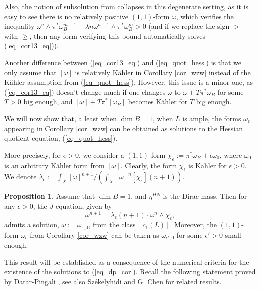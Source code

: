 \documentclass[12pt]{article}
\numberwithin{equation}{section}
\theoremstyle{theorem}
\theoremstyle{definition}
\newtheorem{prop}[thm]{Proposition}
\theoremstyle{remark}
\begin{document}
	Also, the notion of subsolution from \cite[(12)]{SzekQuotHess} collapses in this degenerate setting, as it is easy to see there is no relatively positive $(1, 1)$-form $\omega$, which verifies the inequality $\omega^n \wedge \pi^* \omega_B^{m - 1} - \lambda n \omega^{n - 1} \wedge \pi^* \omega_B^m > 0$ (and if we replace the sign $>$ with $\geq$, then any form verifying this bound automatically solves (\ref{eq_cor13_eq})).
	\par 
	Another difference between (\ref{eq_cor13_eq}) and (\ref{eq_quot_hess}) is that we only assume that $[\omega]$ is relatively Kähler in Corollary \ref{cor_wzw} instead of the Kähler assumption from (\ref{eq_quot_hess}). 
	However, this issue is a minor one, as (\ref{eq_cor13_eq}) doesn't change much if one changes $\omega$ to $\omega + T \pi^* \omega_B$ for some $T > 0$ big enough, and $[\omega] + T \pi^* [\omega_B]$ becomes Kähler for $T$ big enough.
	\par 
	We will now show that, a least when $\dim B = 1$, when $L$ is ample, the forms $\omega_{\epsilon}$ appearing in Corollary \ref{cor_wzw} can be obtained as solutions to the Hessian quotient equation, (\ref{eq_quot_hess}).
	\par 
	More precisely, for $\epsilon > 0$, we consider a $(1, 1)$-form $\chi_{\epsilon} := \pi^* \omega_B + \epsilon \omega_0$, where $\omega_0$ is an arbitrary Kähler form from $[\omega]$.
	Clearly, the form $\chi_{\epsilon}$ is Kähler for $\epsilon > 0$.
	We denote $\lambda_{\epsilon} := \int_X [\omega]^{n + 1} / ( \int_X [\omega]^n  [\chi_{\epsilon}] (n + 1) )$.
	\begin{prop}\label{prop_dp_cor}
		Assume that $\dim B = 1$, and $\eta^{HN}$ is the Dirac mass. Then for any $\epsilon > 0$, the $J$-equation, given by
		\begin{equation}\label{eq_dp_cor}
			\omega^{n + 1} = \lambda_{\epsilon} (n + 1) \cdot \omega^n \wedge \chi_{\epsilon},
		\end{equation}
		admits a solution, $\omega := \omega_{\epsilon, 0}$, from the class $[c_1(L)]$.
		Moreover, the $(1, 1)$-form $\omega_{\epsilon}$ from Corollary \ref{cor_wzw} can be taken as $\omega_{\epsilon', 0}$ for some $\epsilon' > 0$ small enough.
	\end{prop}
	This result will be established as a consequence of the numerical criteria for the existence of the solutions to (\ref{eq_dp_cor}).
	Recall the following statement proved by Datar-Pingali \cite[Theorem 1.1]{DatarPingali}, see also Székelyhidi \cite{SzekQuotHess} and G. Chen \cite{ChenGao} for related results.
\end{document}
